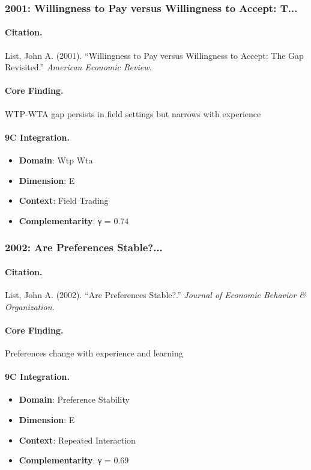 \subsubsection{2001: Willingness to Pay versus Willingness to Accept: T...}

\paragraph{Citation.}
List, John A. (2001). ``Willingness to Pay versus Willingness to Accept: The Gap Revisited.''
\textit{American Economic Review}.

\paragraph{Core Finding.}
WTP-WTA gap persists in field settings but narrows with experience

\paragraph{9C Integration.}
\begin{itemize}[nosep]
  \item \textbf{Domain}: Wtp Wta
  \item \textbf{Dimension}: E
  \item \textbf{Context}: Field Trading
  \item \textbf{Complementarity}: γ = 0.74
\end{itemize}


\subsubsection{2002: Are Preferences Stable?...}

\paragraph{Citation.}
List, John A. (2002). ``Are Preferences Stable?.''
\textit{Journal of Economic Behavior & Organization}.

\paragraph{Core Finding.}
Preferences change with experience and learning

\paragraph{9C Integration.}
\begin{itemize}[nosep]
  \item \textbf{Domain}: Preference Stability
  \item \textbf{Dimension}: E
  \item \textbf{Context}: Repeated Interaction
  \item \textbf{Complementarity}: γ = 0.69
\end{itemize}


